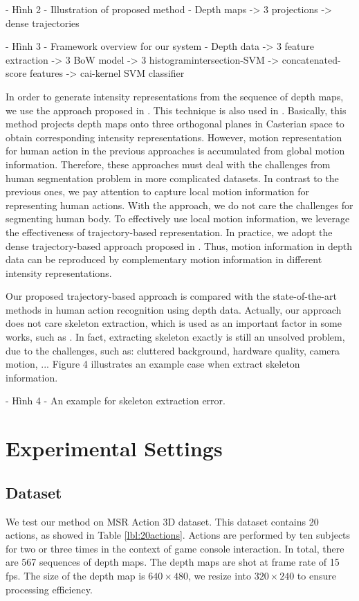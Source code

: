 \documentclass[review]{elsarticle}
\begin{document}
- Hình 2 - Illustration of proposed method - Depth maps -> 3 projections -> dense trajectories

- Hình 3 - Framework overview for our system - Depth data -> 3 feature extraction -> 3 BoW model -> 3 histogramintersection-SVM -> concatenated-score features -> cai-kernel SVM classifier

In order to generate intensity representations from the sequence of depth maps, we use the approach proposed in \cite{li2010action}. This technique is also used in \cite{yang2012recognizing}. Basically, this method projects depth maps onto three orthogonal planes in Casterian space to obtain corresponding intensity representations. However, motion representation for human action in the previous approaches is accumulated from global motion information. Therefore, these approaches must deal with the challenges from human segmentation problem in more complicated datasets. In contrast to the previous ones, we pay attention to capture local motion information for representing human actions. With the approach, we do not care the challenges for segmenting human body. To effectively use local motion information, we leverage the effectiveness of trajectory-based representation. In practice, we adopt the dense trajectory-based approach proposed in \cite{wang2011densetraj}. Thus, motion information in depth data can be reproduced by complementary motion information in different intensity representations.

Our proposed trajectory-based approach is compared with the state-of-the-art methods in human action recognition using depth data. Actually, our approach does not care skeleton extraction, which is used as an important factor in some works, such as \cite{wang2012mining, yang2012eigenjoints}. In fact, extracting skeleton exactly is still an unsolved problem, due to the challenges, such as: cluttered background, hardware quality, camera motion, ... Figure 4 illustrates an example case when extract skeleton information.

- Hình 4 - An example for skeleton extraction error.

\section{Experimental Settings}

\subsection{Dataset}
We test our method on MSR Action 3D dataset. This dataset contains 20 actions, as showed in Table \ref{lbl:20actions}. Actions are performed by ten subjects for two or three times in the context of game console interaction. In total, there are 567 sequences of depth maps. The depth maps are shot at frame rate of 15 fps. The size of the depth map is $640 \times 480$, we resize into $320 \times 240$ to ensure processing efficiency.
\end{document}
